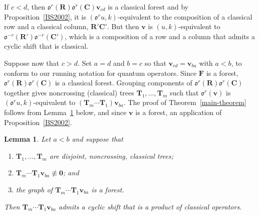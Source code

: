 \documentclass[12pt,oneside,reqno]{amsart}
\newtheorem{lemma}[theorem]{Lemma}
\theoremstyle{definition}
\numberwithin{equation}{section}
\newcommand{\qv}{{\mathbf v}}
\newcommand{\bzero}{{\mathbf 0}}
\newcommand{\ncycle}{\mathfrak o}
\def\R{\mathbf{R}}
\def\C{\mathbf{C}}
\def\F{\mathbf{F}}
\def\T{\mathbf{T}}
\begin{document}
If  $c<d$, then $\ncycle^r(\R)\ncycle^r(\C)\qv_{cd}$ is a classical forest and by
Proposition~\ref{BS2002}, it is $(\ncycle^r u, k)$-equivalent to the composition of a 
classical row and a classical column, $\R' \C'$.
But then $\qv$ is $(u, k)$-equivalent to $\ncycle^{-r}(\R')\ncycle^{-r}(\C')$, which is a composition of a row and a column that admits a cyclic
shift that is classical. 

Suppose now that $c>d$.
Set $a=d$ and $b=c$ so that $\qv_{cd}=\qv_{ba}$ with $a<b$, to conform to our running notation for quantum operators.
Since $\F$ is a forest,  $\ncycle^r(\R)\ncycle^r(\C)$ is a classical forest.
Grouping components of $\ncycle^r(\R)\ncycle^r(\C)$ together gives  noncrossing (classical) trees $\T_1,\dotsc,\T_m$ such that
$\ncycle^r(\qv)$ is $(\ncycle^r u, k)$-equivalent to $(\T_m\dotsb\T_1)\qv_{ba}$.
The proof of Theorem~\ref{main-theorem} follows from Lemma~\ref{cyclic-shift-classical-trees-times-quantum} below,
and since $\qv$ is a forest, an application of Proposition~\ref{BS2002}.


\begin{lemma}
    \label{cyclic-shift-classical-trees-times-quantum}
    Let $a<b$  and suppose that
    \begin{enumerate}[label={{\rm(\roman*)}}]
        \item
            $\T_1, \ldots, \T_m$ are disjoint, noncrossing, classical trees;

        \item
            $\T_m \cdots \T_1 \qv_{ba} \not\equiv \bzero$; and 

        \item
            the graph of $\T_m \cdots \T_1 \qv_{ba}$ is a forest.
    \end{enumerate}
    Then $\T_m \cdots \T_1 \qv_{ba}$
    admits a cyclic shift that is a product of classical operators.
\end{lemma}
\end{document}
